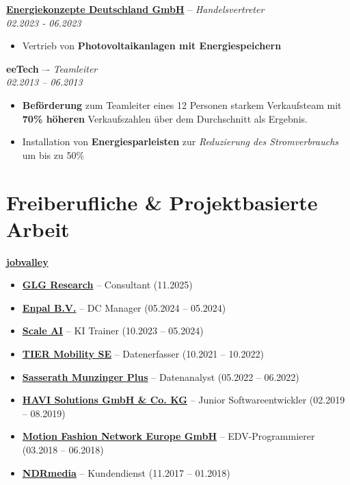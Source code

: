 \documentclass[a4paper,10pt]{article}
\begin{document}
\vspace{5pt}

\noindent\textbf{\href{https://www.ekd-solar.de/}{Energiekonzepte Deutschland GmbH}} -- \textit{Handelsvertreter} \\
\textit{02.2023 - 06.2023}
\begin{itemize}
    \item Vertrieb von \textbf{Photovoltaikanlagen mit Energiespeichern}
\end{itemize}

\vspace{5pt}

\noindent\textbf{eeTech} –- \textit{Teamleiter} \\
\textit{02.2013 – 06.2013}
\begin{itemize}
    \item[\faChartLine] \textbf{Beförderung} zum Teamleiter eines 12 Personen starkem Verkaufsteam mit \textbf{70\% höheren}
Verkaufszahlen über dem Durchschnitt als Ergebnis.
    \item Installation von \textbf{Energiesparleisten} zur \textit{Reduzierung des Stromverbrauchs} um bis zu 50\%
\end{itemize}

\section*{Freiberufliche \& Projektbasierte Arbeit}
\textbf{\href{https://www.jobvalley.com/}{jobvalley}}
\begin{itemize}
    \item \textbf{\href{https://glginsights.com/}{GLG Research}} – Consultant (11.2025)
    \item[\faHeadset] \textbf{\href{https://www.enpal.de/}{Enpal B.V.}} – DC Manager (05.2024 – 05.2024)
    \item[\faRobot] \textbf{\href{https://www.outlier.ai/}{Scale AI}} – KI Trainer (10.2023 – 05.2024)
    \item[\faChartLine] \textbf{\href{https://www.tier.app/}{TIER Mobility SE}} – Datenerfasser (10.2021 – 10.2022)
    \item[\faChartPie] \textbf{\href{https://www.sasserath-munzinger.de/}{Sasserath Munzinger Plus}} – Datenanalyst (05.2022 – 06.2022)
    \item[\faTerminal] \textbf{\href{https://www.havi.com/}{HAVI Solutions GmbH \& Co. KG}} – Junior Softwareentwickler (02.2019 – 08.2019)
    \item[\faTerminal] \textbf{\href{https://www.motion-fashion.com/}{Motion Fashion Network Europe GmbH}} – EDV-Programmierer (03.2018 – 06.2018)
    \item[\faHeadset] \textbf{\href{https://www.ndrmedia.de/}{NDRmedia}} – Kundendienst (11.2017 – 01.2018)
\end{itemize}
\end{document}
